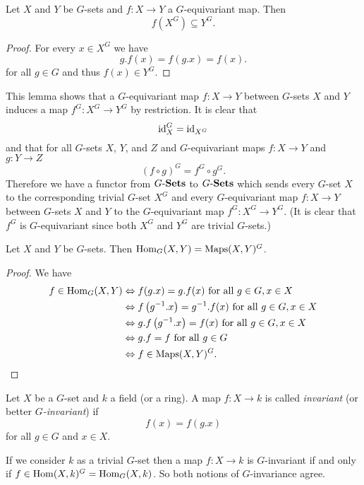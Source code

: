 \begin{lem}
 Let $X$ and $Y$ be $G$-sets and $f \colon X \to Y$ a $G$-equivariant map. Then
 \[
  f\left( X^G \right) \subseteq Y^G.
 \]
\end{lem}
\begin{proof}
 For every $x \in X^G$ we have
 \[
  g.f(x) = f(g.x) = f(x).
 \]
 for all $g \in G$ and thus $f(x) \in Y^G$.
\end{proof}


This lemma shows that a $G$-equivariant map $f \colon X \to Y$ between $G$-sets $X$ and $Y$ induces a map $f^G \colon X^G \to Y^G$ by restriction. It is clear that
\[
 \operatorname{id}_X^G = \operatorname{id}_{X^G}
\]
and that for all $G$-sets $X$, $Y$, and $Z$ and $G$-equivariant maps $f \colon X \to Y$ and $g \colon Y \to Z$
\[
 (f \circ g)^G =  f^G \circ g^G.
\]
Therefore we have a functor from $G\text{-}\mathbf{Sets}$ to $G\text{-}\mathbf{Sets}$ which sends every $G$-set $X$ to the corresponding trivial $G$-set $X^G$ and every $G$-equivariant map $f \colon X \to Y$ between $G$-sets $X$ and $Y$ to the $G$-equivariant map $f^G \colon X^G \to Y^G$. (It is clear that $f^G$ is $G$-equivariant since both $X^G$ and $Y^G$ are trivial $G$-sets.)


\begin{lem}
 Let $X$ and $Y$ be $G$-sets. Then $\operatorname{Hom}_G(X,Y) = \operatorname{Maps}(X,Y)^G$.
\end{lem}
\begin{proof}
 We have
 \begin{align*}
  f \in \operatorname{Hom}_G(X,Y)
  &\Leftrightarrow f(g.x) = g.f(x) \text{ for all } g \in G, x \in X \\
  &\Leftrightarrow f\left(g^{-1}.x\right) = g^{-1}.f(x) \text{ for all } g \in G, x \in X \\
  &\Leftrightarrow g.f\left(g^{-1}.x\right) = f(x) \text{ for all } g \in G, x \in X \\
  &\Leftrightarrow g.f = f \text{ for all } g \in G \\
  &\Leftrightarrow f \in \operatorname{Maps}(X,Y)^G.
  \qedhere
 \end{align*}
\end{proof}


\begin{defi}
 Let $X$ be a $G$-set and $k$ a field (or a ring). A map $f \colon X \to k$ is called \emph{invariant} (or better \emph{$G$-invariant}) if
 \[
  f(x) = f\left( g.x \right)
 \]
 for all $g \in G$ and $x \in X$.
\end{defi}


\begin{note}
 If we consider $k$ as a trivial $G$-set then a map $f \colon X \to k$ is $G$-invariant if and only if $f \in \operatorname{Hom}(X,k)^G = \operatorname{Hom}_G(X,k)$. So both notions of $G$-invariance agree.
\end{note}



